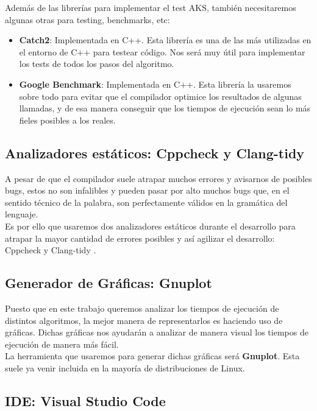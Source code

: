 Además de las librerías para implementar el test AKS, también necesitaremos algunas otras para testing, benchmarks, etc:

\begin{itemize}
	\item \textbf{Catch2}: Implementada en C++. Esta librería es una de las más utilizadas en el entorno de C++ para testear código. Nos será muy útil para implementar los tests de todos los pasos del algoritmo.
	
	\item \textbf{Google Benchmark}: Implementada en C++. Esta librería la usaremos sobre todo para evitar que el compilador optimice los resultados de algunas llamadas, y de esa manera conseguir que los tiempos de ejecución sean lo más fieles posibles a los reales.
\end{itemize}

\subsection{Analizadores estáticos: Cppcheck y Clang-tidy}

A pesar de que el compilador suele atrapar muchos errores y avisarnos de posibles bugs, estos no son infalibles y pueden pasar por alto muchos bugs que, en el sentido técnico de la palabra, son perfectamente válidos en la gramática del lenguaje.\\

Es por ello que usaremos dos analizadores estáticos durante el desarrollo para atrapar la mayor cantidad de errores posibles y así agilizar el desarrollo: Cppcheck \cite{cppcheck} y Clang-tidy \cite{clang_tidy}.

\subsection{Generador de Gráficas: Gnuplot}

Puesto que en este trabajo queremos analizar los tiempos de ejecución de distintos algoritmos, la mejor manera de representarlos es haciendo uso de gráficas. Dichas gráficas nos ayudarán a analizar de manera visual los tiempos de ejecución de manera más fácil.\\

La herramienta que usaremos para generar dichas gráficas será \textbf{Gnuplot}. Esta suele ya venir incluida en la mayoría de distribuciones de Linux.

\subsection{IDE: Visual Studio Code}

